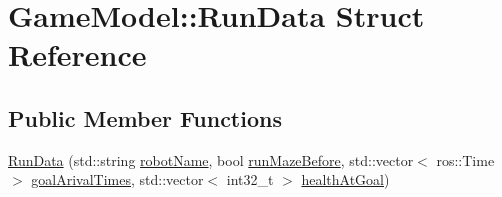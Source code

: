 \hypertarget{structGameModel_1_1RunData}{\section{Game\-Model\-:\-:Run\-Data Struct Reference}
\label{structGameModel_1_1RunData}
}
\subsection*{Public Member Functions}
\begin{DoxyCompactItemize}
\item 
\hyperlink{structGameModel_1_1RunData_aaa8ae72413a2d4d329a844c7bffb62bf}{Run\-Data} (std\-::string \hyperlink{structGameModel_1_1RunData_a7ee17ad14e766e04af2cfbda2cbdfd85}{robot\-Name}, bool \hyperlink{structGameModel_1_1RunData_a484c66c26eaa03ea0fb65dd34f583a8f}{run\-Maze\-Before}, std\-::vector$<$ ros\-::\-Time $>$ \hyperlink{structGameModel_1_1RunData_a23618079bed4bbb5922164e918f84b76}{goal\-Arival\-Times}, std\-::vector$<$ int32\-\_\-t $>$ \hyperlink{structGameModel_1_1RunData_abf064d5f2980c5a03227b3ec7345e345}{health\-At\-Goal})
\end{DoxyCompactItemize}
